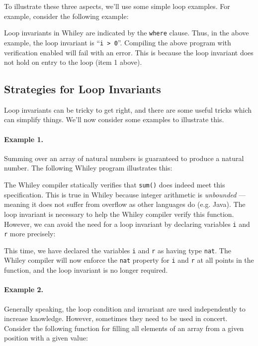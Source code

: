 To illustrate these three aspects, we'll use some simple loop
examples.  For example, consider the following example:



Loop invariants in Whiley are indicated by the \lstinline{where}
clause.  Thus, in the above example, the loop invariant is
``\lstinline{i > 0}''.  Compiling the above program with verification
enabled will fail with an error.   This is because the loop invariant
does not hold on entry to the loop (item 1 above).

\subsection{Strategies for Loop Invariants}
Loop invariants can be tricky to get right, and there are some useful
tricks which can simplify things.  We'll now consider some examples to
illustrate this.

\paragraph{Example 1.} Summing over an array of natural numbers is
guaranteed to produce a natural number.  The following Whiley program
illustrates this:



The Whiley compiler statically verifies that \lstinline{sum()} does
indeed meet this specification.  This is true in Whiley because
integer arithmetic is {\em unbounded} --- meaning it does not suffer
from overflow as other languages do (e.g. Java).  The loop invariant
is necessary to help the Whiley compiler verify this function.
However, we can avoid the need for a loop invariant by declaring
variables \lstinline{i} and \lstinline{r} more precisely:



This time, we have declared the variables \lstinline{i} and
\lstinline{r} as having type \lstinline{nat}.  The Whiley compiler
will now enforce the \lstinline{nat} property for \lstinline{i} and
\lstinline{r} at all points in the function, and the loop invariant is
no longer required.

\paragraph{Example 2.}  Generally speaking, the loop condition and
invariant are used independently to increase knowledge.  However,
sometimes they need to be used in concert.  Consider the following
function for filling all elements of an array from a given position
with a given value:

